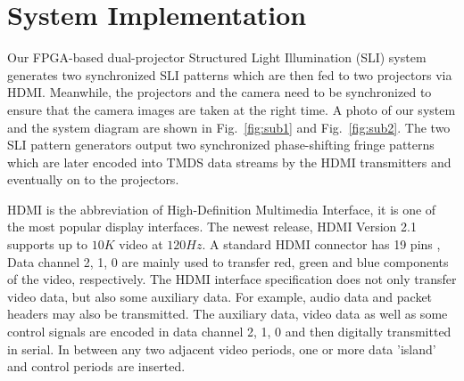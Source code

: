 \documentclass[]{spie}  %
\begin{document}
\section{System Implementation}
Our FPGA-based dual-projector Structured Light Illumination (SLI) system generates two synchronized SLI patterns which are then fed to two projectors via HDMI. Meanwhile, the projectors and the camera need to be synchronized to ensure that the camera images are taken at the right time. A photo of our system and the system diagram are shown in Fig.~\ref{fig:sub1} and Fig.~\ref{fig:sub2}. The two SLI pattern generators output two synchronized phase-shifting fringe patterns which are later encoded into TMDS data streams by the HDMI transmitters and eventually on to the projectors. 


HDMI is the abbreviation of High-Definition Multimedia Interface, it is one of the most popular display interfaces. The newest release, HDMI Version 2.1 supports up to $10K$ video at $120 Hz$. A standard HDMI connector has 19 pins \cite{hdmi14}, Data channel 2, 1, 0 are mainly used to transfer red, green and blue components of the video, respectively. The HDMI interface specification does not only transfer video data, but also some auxiliary data. For example, audio data and packet headers may also be transmitted. The auxiliary data, video data as well as some control signals are encoded in data channel 2, 1, 0 and then digitally transmitted in serial. In between any two adjacent video periods, one or more data 'island' and control periods are inserted. 
\end{document}
